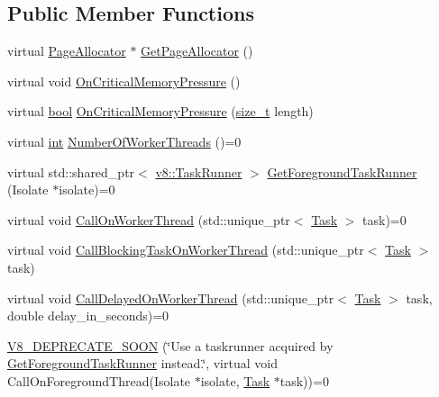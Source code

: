 \subsection*{Public Member Functions}
\begin{DoxyCompactItemize}
\item 
virtual \mbox{\hyperlink{classv8_1_1PageAllocator}{Page\+Allocator}} $\ast$ \mbox{\hyperlink{classv8_1_1Platform_ab7c1886dd8131f7389b805bc98276702}{Get\+Page\+Allocator}} ()
\item 
virtual void \mbox{\hyperlink{classv8_1_1Platform_a7ed41bddc1d1ebe51c55539198d0026e}{On\+Critical\+Memory\+Pressure}} ()
\item 
virtual \mbox{\hyperlink{classbool}{bool}} \mbox{\hyperlink{classv8_1_1Platform_a0de4b8a7bb8865ce65beb5afbaabe4cc}{On\+Critical\+Memory\+Pressure}} (\mbox{\hyperlink{classsize__t}{size\+\_\+t}} length)
\item 
virtual \mbox{\hyperlink{classint}{int}} \mbox{\hyperlink{classv8_1_1Platform_a57cdd7eb4c482bfb806c378beeda716d}{Number\+Of\+Worker\+Threads}} ()=0
\item 
virtual std\+::shared\+\_\+ptr$<$ \mbox{\hyperlink{classv8_1_1TaskRunner}{v8\+::\+Task\+Runner}} $>$ \mbox{\hyperlink{classv8_1_1Platform_af0d18c6bbefa133c5d11ec8a460d0278}{Get\+Foreground\+Task\+Runner}} (Isolate $\ast$isolate)=0
\item 
virtual void \mbox{\hyperlink{classv8_1_1Platform_a92dc9c2f54c9a0fea87e15df8d58d699}{Call\+On\+Worker\+Thread}} (std\+::unique\+\_\+ptr$<$ \mbox{\hyperlink{classv8_1_1Task}{Task}} $>$ task)=0
\item 
virtual void \mbox{\hyperlink{classv8_1_1Platform_ada31b440048763bf8d9c296ca4cf2e1b}{Call\+Blocking\+Task\+On\+Worker\+Thread}} (std\+::unique\+\_\+ptr$<$ \mbox{\hyperlink{classv8_1_1Task}{Task}} $>$ task)
\item 
virtual void \mbox{\hyperlink{classv8_1_1Platform_a808b0e55ed3efca10ebca031bbd6ecc6}{Call\+Delayed\+On\+Worker\+Thread}} (std\+::unique\+\_\+ptr$<$ \mbox{\hyperlink{classv8_1_1Task}{Task}} $>$ task, double delay\+\_\+in\+\_\+seconds)=0
\item 
\mbox{\hyperlink{classv8_1_1Platform_a2a25af03a35d938b37f2378d25ad4c6e}{V8\+\_\+\+D\+E\+P\+R\+E\+C\+A\+T\+E\+\_\+\+S\+O\+ON}} (\char`\"{}Use a taskrunner acquired by \mbox{\hyperlink{classv8_1_1Platform_af0d18c6bbefa133c5d11ec8a460d0278}{Get\+Foreground\+Task\+Runner}} instead.\char`\"{}, virtual void Call\+On\+Foreground\+Thread(Isolate $\ast$isolate, \mbox{\hyperlink{classv8_1_1Task}{Task}} $\ast$task))=0

\end{DoxyCompactItemize}
